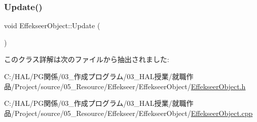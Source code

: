 \subsubsection{\texorpdfstring{Update()}{Update()}}
{\footnotesize\ttfamily void Effekseer\+Object\+::\+Update (\begin{DoxyParamCaption}{ }\end{DoxyParamCaption})}



このクラス詳解は次のファイルから抽出されました\+:\begin{DoxyCompactItemize}
\item 
C\+:/\+H\+A\+L/\+P\+G関係/03\+\_\+作成プログラム/03\+\_\+\+H\+A\+L授業/就職作品/\+Project/source/05\+\_\+\+Resource/\+Effekseer/\+Effekseer\+Object/\mbox{\hyperlink{_effekseer_object_8h}{Effekseer\+Object.\+h}}\item 
C\+:/\+H\+A\+L/\+P\+G関係/03\+\_\+作成プログラム/03\+\_\+\+H\+A\+L授業/就職作品/\+Project/source/05\+\_\+\+Resource/\+Effekseer/\+Effekseer\+Object/\mbox{\hyperlink{_effekseer_object_8cpp}{Effekseer\+Object.\+cpp}}\end{DoxyCompactItemize}
